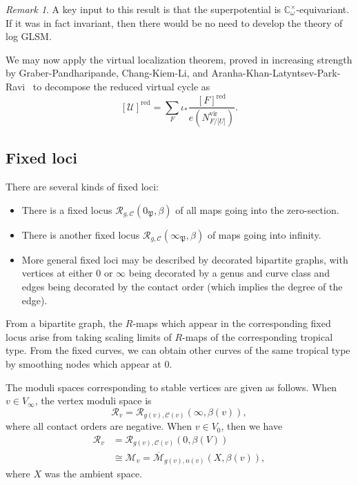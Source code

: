 \documentclass[10pt]{amsart}
\theoremstyle{definition}
\theoremstyle{remark}
\newtheorem{rmk}[thm]{Remark}
\theoremstyle{plain}
\theoremstyle{definition}
\theoremstyle{remark}
\newcommand{\C}{\mathbb{C}}
\newcommand{\Mbar}{\overline{\mathcal{M}}}
\newcommand{\mc}[1]{\mathcal{#1}}
\newcommand{\mf}[1]{\mathfrak{#1}}
\newcommand{\mr}[1]{\mathrm{#1}}
\newcommand{\1}{\mathbf{1}}
\newcommand{\2}{\mathbf{2}}
\newcommand{\3}{\mathbf{3}}
\newcommand{\vir}{\mr{vir}}
\newcommand{\red}{\mr{red}}
\begin{document}
\begin{rmk}
    A key input to this result is that the superpotential is $\C_{\omega}^{\times}$-equivariant. If it was in fact invariant, then there would be no need to develop the theory of log GLSM.
\end{rmk}

We may now apply the virtual localization theorem, proved in increasing strength by Graber-Pandharipande, Chang-Kiem-Li, and Aranha-Khan-Latyntsev-Park-Ravi~\cite{virtloc,locwccosection,virtloc2} to decompose the reduced virtual cycle as
\[ [\mc{U}]^{\red} = \sum_F \iota_* \frac{[F]^{\red}}{e(N_{F/\mc[U]}^{\vir})}. \]


\subsection{Fixed loci}%
\label{sub:Fixed loci}

There are several kinds of fixed loci:
\begin{itemize}
    \item There is a fixed locus $\mc{R}_{g,\mc{C}}(0_{\mf{P}}, \beta)$ of all maps going into the zero-section.
    \item There is another fixed locus $\mc{R}_{g,\mc{C}}(\infty_{\mf{P}}, \beta)$ of maps going into infinity.
    \item More general fixed loci may be described by decorated bipartite graphs, with vertices at either $0$ or $\infty$ being decorated by a genus and curve class and edges being decorated by the contact order (which implies the degree of the edge).
\end{itemize}
From a bipartite graph, the $R$-maps which appear in the corresponding fixed locus arise from taking scaling limits of $R$-maps of the corresponding tropical type. From the fixed curves, we can obtain other curves of the same tropical type by smoothing nodes which appear at $0$.

The moduli spaces corresponding to stable vertices are given as follows. When $v \in V_{\infty}$, the vertex moduli space is
\[ \mc{R}_v = \mc{R}_{g(v), \mc{C}(v)}(\infty, \beta(v)), \]
where all contact orders are negative. When $v \in V_0$, then we have
\begin{align*}
    \mc{R}_v &= \mc{R}_{g(v), \mc{C}(v)}(0, \beta(V)) \\
    &\cong \mc{M}_v = \Mbar_{g(v), n(v)} (X, \beta(v)),
\end{align*}
where $X$ was the ambient space.
\end{document}
